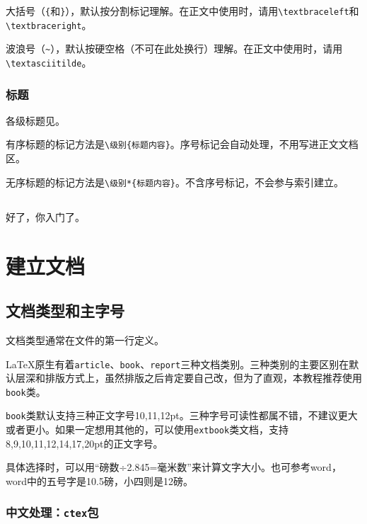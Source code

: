 \documentclass[10pt,openany]{book}
\begin{document}
\begin{sloppypar}
    大括号（\texttt{\{}和\texttt{\}}），默认按分割标记理解。在正文中使用时，请用\texttt{\textbackslash{}textbraceleft}和\texttt{\textbackslash{}textbraceright}。

    波浪号（\texttt{\textasciitilde{}}），默认按硬空格（不可在此处换行）理解。在正文中使用时，请用\texttt{\textbackslash{}textasciitilde}。

    \subsection{标题}

    各级标题见\textit{}。

    有序标题的标记方法是\texttt{\textbackslash{}级别\{标题内容\}}。序号标记会自动处理，不用写进正文文档区。

    无序标题的标记方法是\texttt{\textbackslash{}级别*\{标题内容\}}。不含序号标记，不会参与索引建立。

    \section*{}

    好了，你入门了。

    \chapter{建立文档}

    \section{文档类型和主字号}

    文档类型通常在文件的第一行定义。

    

    {\LaTeX}原生有着\texttt{article}、\texttt{book}、\texttt{report}三种文档类别。三种类别的主要区别在默认层深和排版方式上，虽然排版之后肯定要自己改，但为了直观，本教程推荐使用\texttt{book}类。

    \texttt{book}类默认支持三种正文字号10,11,12pt。三种字号可读性都属不错，不建议更大或者更小。如果一定想用其他的，可以使用\texttt{extbook}类文档，支持8,9,10,11,12,14,17,20pt的正文字号。

    具体选择时，可以用“磅数÷2.845=毫米数”来计算文字大小。也可参考word，word中的五号字是10.5磅，小四则是12磅。

    \subsection{中文处理：\texttt{ctex}包}


\end{sloppypar}
\end{document}
